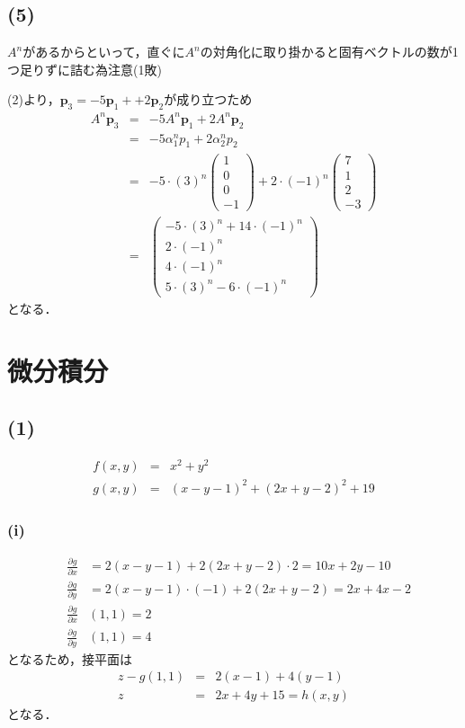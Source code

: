 \documentclass[11pt, titlepage]{jsarticle}
\begin{document}
\newpage
\subsection*{(5)}
$A^n$があるからといって，直ぐに$A^n$の対角化に取り掛かると固有ベクトルの数が1つ足りずに詰む為注意(1敗)

(2)より，$\boldsymbol p_3=-5 \boldsymbol p_1 + +2 \boldsymbol p_2$が成り立つため
\begin{eqnarray*}
  A^n \boldsymbol p_3 &=& -5 A^n \boldsymbol p_1 + 2 A^n \boldsymbol p_2 \\
  &=& -5\alpha_1^n p_1 + 2\alpha_2^n p_2 \\
  &=& -5\cdot(3)^n \begin{pmatrix}
    1 \\
    0 \\
    0 \\
    -1
  \end{pmatrix} + 2\cdot(-1)^n \begin{pmatrix}
    7 \\
    1 \\
    2 \\
    -3
  \end{pmatrix}\\
  &=&\begin{pmatrix}
    -5\cdot(3)^n  + 14\cdot(-1)^n \\
    2\cdot(-1)^n                  \\
    4\cdot(-1)^n                  \\
    5\cdot(3)^n  -6\cdot(-1)^n
  \end{pmatrix}
\end{eqnarray*}
となる．

\newpage
\section{微分積分}
\subsection*{(1)}
\begin{eqnarray*}
  f(x,y)&=&x^2+y^2\\
  g(x,y)&=&(x-y-1)^2+(2x+y-2)^2+19
\end{eqnarray*}
\subsubsection*{(i)}
\begin{eqnarray*}
  &\frac{\partial g}{\partial x}&=2(x-y-1)+2(2x+y-2)\cdot 2=10x+2y-10\\
  &\frac{\partial g}{\partial y}&=2(x-y-1)\cdot(-1)+2(2x+y-2)=2x+4x-2\\
  &\frac{\partial g}{\partial x}&(1,1)=2\\
  &\frac{\partial g}{\partial y}&(1,1)=4
\end{eqnarray*}
となるため，接平面は
\begin{eqnarray*}
  z-g(1,1)&=&2(x-1)+4(y-1) \\
  z&=&2x+4y+15=h(x,y)
\end{eqnarray*}
となる．
\end{document}
